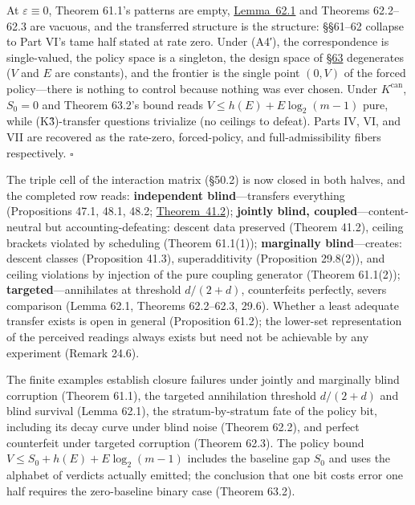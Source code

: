 \begin{thmplain}

At \(\varepsilon \equiv 0\), Theorem 61.1's patterns are empty, \hyperlink{stmt:62.1}{Lemma~62.1} and Theorems 62.2--62.3 are vacuous, and the transferred structure is the structure: §§61--62 collapse to Part VI's tame half stated at rate zero. Under (A4′), the correspondence is single-valued, the policy space is a singleton, the design space of \hyperlink{sec:63}{§63} degenerates (\(V\) and \(E\) are constants), and the frontier is the single point \((0, V)\) of the forced policy---\hspace{0pt}there is nothing to control because nothing was ever chosen. Under \(K^{\mathrm{can}}\), \(S_0 = 0\) and Theorem 63.2's bound reads \(V \le h(E) + E\log_2(m-1)\) pure, while (K3̂)-transfer questions trivialize (no ceilings to defeat). Parts IV, VI, and VII are recovered as the rate-zero, forced-policy, and full-admissibility fibers respectively. \(\square\)
\end{thmplain}

The triple cell of the interaction matrix (§50.2) is now closed in both halves, and the completed row reads: \textbf{independent blind}---\hspace{0pt}transfers everything (Propositions 47.1, 48.1, 48.2; \hyperlink{stmt:41.2}{Theorem~41.2}); \textbf{jointly blind, coupled}---\hspace{0pt}content-neutral but accounting-defeating: descent data preserved (Theorem 41.2), ceiling brackets violated by scheduling (Theorem 61.1(1)); \textbf{marginally blind}---\hspace{0pt}creates: descent classes (Proposition 41.3), superadditivity (Proposition 29.8(2)), and ceiling violations by injection of the pure coupling generator (Theorem 61.1(2)); \textbf{targeted}---\hspace{0pt}annihilates at threshold \(d/(2+d)\), counterfeits perfectly, severs comparison (Lemma 62.1, Theorems 62.2--62.3, 29.6). Whether a least adequate transfer exists is open in general (Proposition 61.2); the lower-set representation of the perceived readings always exists but need not be achievable by any experiment (Remark 24.6).


The finite examples establish closure failures under jointly and marginally blind corruption (Theorem 61.1), the targeted annihilation threshold \(d/(2+d)\) and blind survival (Lemma 62.1), the stratum-by-stratum fate of the policy bit, including its decay curve under blind noise (Theorem 62.2), and perfect counterfeit under targeted corruption (Theorem 62.3). The policy bound \(V \le S_0 + h(E) + E\log_2(m-1)\) includes the baseline gap \(S_0\) and uses the alphabet of verdicts actually emitted; the conclusion that one bit costs error one half requires the zero-baseline binary case (Theorem 63.2).

